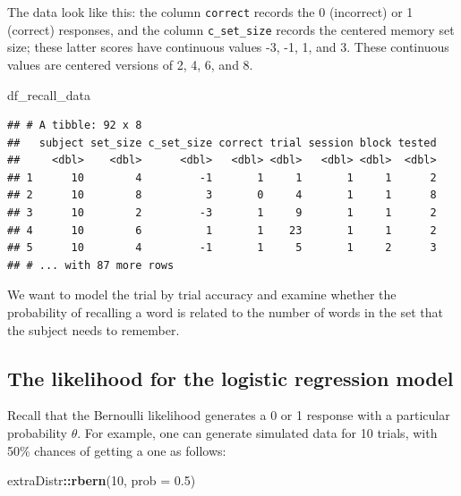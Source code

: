 \documentclass[12pt,]{krantz}
\newenvironment{Shaded}{\begin{snugshade}}{\end{snugshade}}
\newcommand{\DataTypeTok}[1]{\textcolor[rgb]{0.13,0.29,0.53}{#1}}
\newcommand{\DecValTok}[1]{\textcolor[rgb]{0.00,0.00,0.81}{#1}}
\newcommand{\FloatTok}[1]{\textcolor[rgb]{0.00,0.00,0.81}{#1}}
\newcommand{\KeywordTok}[1]{\textcolor[rgb]{0.13,0.29,0.53}{\textbf{#1}}}
\newcommand{\NormalTok}[1]{#1}
\newcommand{\OperatorTok}[1]{\textcolor[rgb]{0.81,0.36,0.00}{\textbf{#1}}}
\theoremstyle{definition}
\theoremstyle{definition}
\theoremstyle{definition}
\theoremstyle{remark}
\begin{document}
The data look like this: the column \texttt{correct} records the 0 (incorrect) or 1 (correct) responses, and the column \texttt{c\_set\_size} records the centered memory set size; these latter scores have continuous values -3, -1, 1, and 3. These continuous values are centered versions of 2, 4, 6, and 8.

\begin{Shaded}
\begin{Highlighting}[]
\NormalTok{df_recall_data}
\end{Highlighting}
\end{Shaded}

\begin{verbatim}
## # A tibble: 92 x 8
##   subject set_size c_set_size correct trial session block tested
##     <dbl>    <dbl>      <dbl>   <dbl> <dbl>   <dbl> <dbl>  <dbl>
## 1      10        4         -1       1     1       1     1      2
## 2      10        8          3       0     4       1     1      8
## 3      10        2         -3       1     9       1     1      2
## 4      10        6          1       1    23       1     1      2
## 5      10        4         -1       1     5       1     2      3
## # ... with 87 more rows
\end{verbatim}

We want to model the trial by trial accuracy and examine whether the probability of recalling a word is related to the number of words in the set that the subject needs to remember.

\hypertarget{the-likelihood-for-the-logistic-regression-model}{%
\subsection{The likelihood for the logistic regression model}\label{the-likelihood-for-the-logistic-regression-model}}

Recall that the Bernoulli likelihood generates a 0 or 1 response with a particular probability \(\theta\). For example, one can generate simulated data for 10 trials, with 50\% chances of getting a one as follows:

\begin{Shaded}
\begin{Highlighting}[]
\NormalTok{extraDistr}\OperatorTok{::}\KeywordTok{rbern}\NormalTok{(}\DecValTok{10}\NormalTok{, }\DataTypeTok{prob =} \FloatTok{0.5}\NormalTok{)}
\end{Highlighting}
\end{Shaded}
\end{document}
